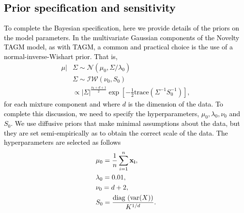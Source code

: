 \documentclass[12pt,english]{article}
\begin{document}
\textcolor{black}{ 
\subsection{Prior specification and sensitivity} \label{section:prior}
To complete the Bayesian specification, here we provide details of the priors on the model parameters. In the multivariate Gaussian components of the Novelty TAGM model, as with TAGM, a common and practical choice is the use of a normal-inverse-Wishart prior. That is,
\begin{equation}
\begin{split}
\mu|&\Sigma \sim \mathcal{N}(\mu_0, \Sigma/\lambda_0) \\
&\Sigma \sim \mathcal{IW}(\nu_0, S_0) \\
& \propto \lvert\Sigma\rvert^{\frac{\nu_0 + d + 1}{2}}\exp\left[-\frac{1}{2}\text{trace}(\Sigma^{-1}S_0^{-1})\right],
\end{split}
\end{equation}
for each mixture component and where $d$ is the dimension of the data. 
To complete this discussion, we need to specify the hyperparameters, $\mu_0, \lambda_0, \nu_0$ and $S_0$. We use diffusive priors that make minimal assumptions about the data, but they are set semi-empirically as to obtain the correct scale of the data. The hyperparameters are selected as follows
\begin{equation}
\begin{split}
&\mu_0 = \frac{1}{n}\sum_{i = 1}^n{\bf x_i}, \\
&\lambda_0 = 0.01, \\
&\nu_0 = d + 2,\\
& S_0 = \frac{\text{diag }(\text{var}(X))}{K^{1/d}}.
\end{split}
\end{equation}
}
\end{document}
